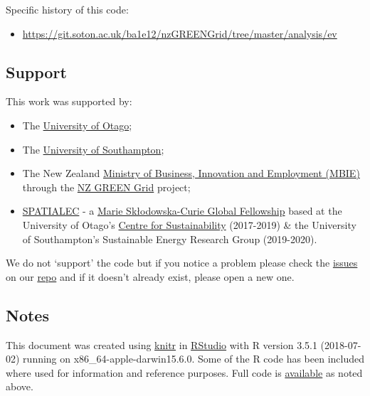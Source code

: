 \documentclass[]{article}
\providecommand{\tightlist}{%
  \setlength{\itemsep}{0pt}\setlength{\parskip}{0pt}}
\begin{document}
Specific history of this code:

\begin{itemize}
\tightlist
\item
  \url{https://git.soton.ac.uk/ba1e12/nzGREENGrid/tree/master/analysis/ev}
\end{itemize}

\subsection{Support}\label{support}

This work was supported by:

\begin{itemize}
\tightlist
\item
  The \href{https://www.otago.ac.nz/}{University of Otago};
\item
  The \href{https://www.southampton.ac.uk/}{University of Southampton};
\item
  The New Zealand \href{http://www.mbie.govt.nz/}{Ministry of Business,
  Innovation and Employment (MBIE)} through the
  \href{https://www.otago.ac.nz/centre-sustainability/research/energy/otago050285.html}{NZ
  GREEN Grid} project;
\item
  \href{http://www.energy.soton.ac.uk/tag/spatialec/}{SPATIALEC} - a
  \href{http://ec.europa.eu/research/mariecurieactions/about-msca/actions/if/index_en.htm}{Marie
  Skłodowska-Curie Global Fellowship} based at the University of Otago's
  \href{http://www.otago.ac.nz/centre-sustainability/staff/otago673896.html}{Centre
  for Sustainability} (2017-2019) \& the University of Southampton's
  Sustainable Energy Research Group (2019-2020).
\end{itemize}

We do not `support' the code but if you notice a problem please check
the \href{https://github.com/CfSOtago/GREENGrid/issues}{issues} on our
\href{https://github.com/CfSOtago/GREENGrid}{repo} and if it doesn't
already exist, please open a new one.

\subsection{Notes}\label{notes}

This document was created using
\href{https://cran.r-project.org/package=knitr}{knitr} in
\href{http://www.rstudio.com}{RStudio} with R version 3.5.1 (2018-07-02)
running on x86\_64-apple-darwin15.6.0. Some of the R code has been
included where used for information and reference purposes. Full code is
\href{https://github.com/CfSOtago/GREENGrid/tree/master/analysis/ev}{available}
as noted above.
\end{document}
